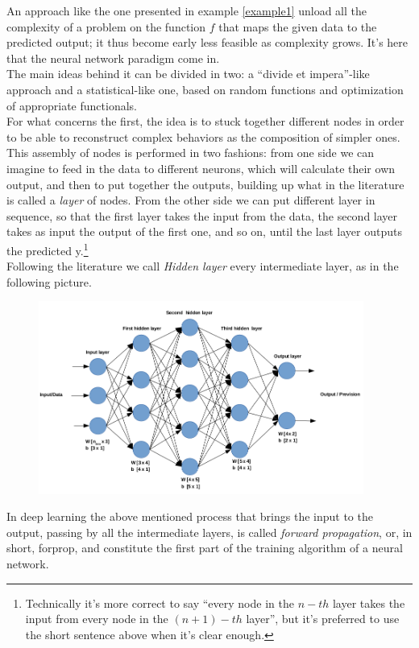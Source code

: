 \documentclass[12pt, a4paper]{report}
\theoremstyle{definition}
\begin{document}
\noindent An approach like the one presented in example \ref{example1} unload all the complexity of a problem on the function $f$ that maps the given data to the predicted output; it thus become early less feasible as complexity grows. It's here that the neural network paradigm come in.\\
The main ideas behind it can be divided in two: a ``divide et impera''-like approach and a statistical-like one, based on random functions and optimization of appropriate functionals.\\
For what concerns the first, the idea is to stuck together different nodes in order to be able to reconstruct complex behaviors as the composition of simpler ones. This assembly of nodes is performed in two fashions: from one side we can imagine to feed in the data to different neurons, which will calculate their own output, and then to put together the outputs, building up what in the literature is called a \textit{layer} of nodes. From the other side we can put different layer in sequence, so that the first layer takes the input from the data, the second layer takes as input the output of the first one, and so on, until the last layer outputs the predicted y.\footnote{Technically it's more correct to say ``every node in the $n\!-\!th$ layer takes the input from every node in the $(n+1)\!-\!th$ layer'', but it's preferred to use the short sentence above when it's clear enough.}\\
Following the literature we call \textit{Hidden layer} every intermediate layer, as in the following picture.
\begin{figure}[h]
\centering
\includegraphics[width=0.95\textwidth]{img/neuralnet}
\caption{}\label{neuralnet}
\end{figure}
\newline
In deep learning the above mentioned process that brings the input to the output, passing by all the intermediate layers, is called \textit{forward propagation}, or, in short, forprop, and constitute the first part of the training algorithm of a neural network.\\
\end{document}
